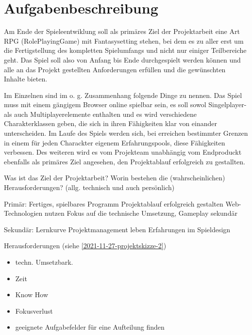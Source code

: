 

\section{Aufgabenbeschreibung}

Am Ende der Spieleentwiklung soll als primäres Ziel der Projektarbeit eine Art RPG (RolePlayingGame) mit Fantasysetting stehen, bei dem es zu aller erst um die Fertigstellung des kompletten Spielumfangs und nicht nur einiger Teilbereiche geht. Das Spiel soll also von Anfang bis Ende durchgespielt werden können und alle an das Projekt gestellten Anforderungen erfüllen und die gewünschten Inhalte bieten. 

Im Einzelnen sind im o. g. Zusammenhang folgende Dinge zu nennen. Das Spiel muss mit einem gängigem Browser online spielbar sein, es soll sowol Singelplayer- als auch Multiplayerelemente enthalten und es wird verschiedene Charakterklassen geben, die sich in ihren Fähigkeiten klar von einander unterscheiden. Im Laufe des Spiels werden sich, bei erreichen bestimmter Grenzen in einem für jeden Charackter eigenem Erfahrungspools, diese Fähigkeiten verbessen. Des weiteren wird es vom Projekteam unabhängig vom Endproduckt ebenfalls als primäres Ziel angesehen, den Projektablauf erfolgreich zu gestallten.


Was ist das Ziel der Projektarbeit? Worin bestehen die (wahrscheinlichen) Herausforderungen? (allg. technisch und auch persönlich)

Primär: 
Fertiges, spielbares Programm 
Projektablauf erfolgreich gestalten 
Web-Technologien nutzen
Fokus auf die technische Umsetzung, Gameplay sekundär

Sekundär: 
Lernkurve
Projektmanagement leben
Erfahrungen im Spieldesign 

Herausforderungen (siehe \ref{2021-11-27-projektskizze-2})

\begin{itemize}
    \item techn. Umsetzbark.
    \item Zeit
    \item Know How
    \item Fokusverlust
    \item geeignete Aufgabefelder für eine Aufteilung finden 
\end{itemize}

